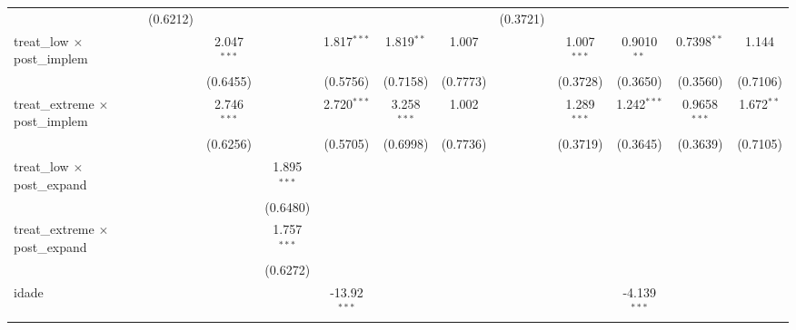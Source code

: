 \begin{table}[htbp]
\begin{tabular}{lccccccccccc}
                                               & (0.6212)      &                &               &                &                &               & (0.3721)       &                &                &                &   \\   
      treat\_low $\times$ post\_implem         &               & 2.047$^{***}$  &               & 1.817$^{***}$  & 1.819$^{**}$   & 1.007         &                & 1.007$^{***}$  & 0.9010$^{**}$  & 0.7398$^{**}$  & 1.144\\   
                                               &               & (0.6455)       &               & (0.5756)       & (0.7158)       & (0.7773)      &                & (0.3728)       & (0.3650)       & (0.3560)       & (0.7106)\\   
      treat\_extreme $\times$ post\_implem     &               & 2.746$^{***}$  &               & 2.720$^{***}$  & 3.258$^{***}$  & 1.002         &                & 1.289$^{***}$  & 1.242$^{***}$  & 0.9658$^{***}$ & 1.672$^{**}$\\   
                                               &               & (0.6256)       &               & (0.5705)       & (0.6998)       & (0.7736)      &                & (0.3719)       & (0.3645)       & (0.3639)       & (0.7105)\\   
      treat\_low $\times$ post\_expand         &               &                & 1.895$^{***}$ &                &                &               &                &                &                &                &   \\   
                                               &               &                & (0.6480)      &                &                &               &                &                &                &                &   \\   
      treat\_extreme $\times$ post\_expand     &               &                & 1.757$^{***}$ &                &                &               &                &                &                &                &   \\   
                                               &               &                & (0.6272)      &                &                &               &                &                &                &                &   \\   
      idade                                    &               &                &               & -13.92$^{***}$ &                &               &                &                & -4.139$^{***}$ &                &   \\   

\end{tabular}
\end{table}
